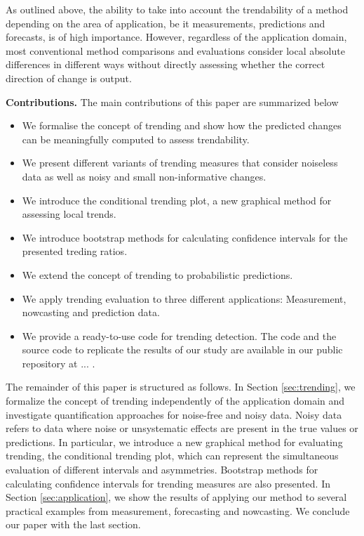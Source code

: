 As outlined above, the ability to take into account the trendability of a method depending on the area of application, be it measurements, predictions and forecasts, is of high importance. 
However, regardless of the application domain, most conventional method comparisons and evaluations consider local absolute differences in different ways without directly assessing whether the correct direction of change is output. 

\textbf{Contributions.} The main contributions of this paper are summarized below
\begin{itemize}

\item We formalise the concept of trending and show how the predicted changes can be meaningfully computed to assess trendability. 

\item We present different variants of trending measures that consider noiseless data as well as noisy and small non-informative changes.

\item We introduce the conditional trending plot, a new graphical method for assessing local trends.

\item We introduce bootstrap methods for calculating  confidence intervals for the presented treding ratios.

\item We extend the concept of trending to probabilistic predictions.

\item We apply trending evaluation to three different applications: Measurement, nowcasting and prediction data. 

\item We provide a ready-to-use code for trending detection. The code and the source code to replicate the results of our study are available in our public repository at ... .
\end{itemize}

The remainder of this paper is structured as follows. 
In Section \ref{sec:trending}, we formalize the concept of trending independently of the application domain and investigate quantification approaches for noise-free and noisy data. Noisy data refers to data where noise or unsystematic effects are present in the true values or predictions.
In particular, we introduce a new graphical method for evaluating trending, the conditional trending plot, which can represent the simultaneous evaluation of different intervals and asymmetries. 
Bootstrap methods for calculating confidence intervals for trending measures are also presented. 
In Section \ref{sec:application}, we show the results of applying our method to several practical examples from measurement, forecasting and nowcasting. 
We conclude our paper with the last section.
